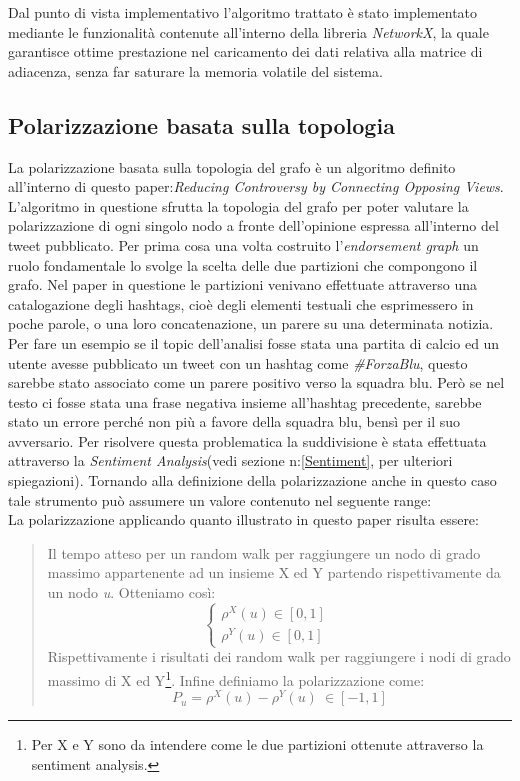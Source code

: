 Dal punto di vista implementativo l'algoritmo trattato è stato implementato mediante le funzionalità contenute all'interno della libreria \textit{NetworkX}, la quale garantisce ottime prestazione nel caricamento dei dati relativa alla matrice di adiacenza, senza far saturare la memoria volatile del sistema.
\newpage
\subsection{Polarizzazione basata sulla topologia}
La polarizzazione basata sulla topologia del grafo è un algoritmo definito all'interno di questo paper:\textit{Reducing Controversy by Connecting Opposing Views}.
L'algoritmo in questione sfrutta la topologia del grafo per poter valutare la polarizzazione di ogni singolo nodo a fronte dell'opinione espressa all'interno del tweet pubblicato.
Per prima cosa una volta costruito l'\textit{endorsement graph} un ruolo fondamentale lo svolge la scelta delle due partizioni che compongono il grafo.
Nel paper in questione le partizioni venivano effettuate attraverso una catalogazione degli hashtags, cioè degli elementi testuali che esprimessero in poche parole, o una loro concatenazione, un parere su una determinata notizia.
Per fare un esempio se il topic dell'analisi fosse stata una partita di calcio ed un utente avesse pubblicato un tweet con un hashtag come \textit{\#ForzaBlu}, questo sarebbe stato associato come un parere positivo verso la squadra blu. Però se nel testo ci fosse stata una frase negativa insieme all'hashtag precedente, sarebbe stato un errore perché non più a favore della squadra blu, bensì per il suo avversario. Per risolvere questa problematica la suddivisione è stata effettuata attraverso la \textit{Sentiment Analysis}(vedi sezione n:\ref{Sentiment}, per ulteriori spiegazioni). 
Tornando alla definizione della polarizzazione anche in questo caso tale strumento può assumere un valore contenuto nel seguente range:
\begin{equation}
[-1,1]
\end{equation}
La polarizzazione applicando quanto illustrato in questo paper risulta essere:
\begin{quote}
Il tempo atteso per un random walk per raggiungere un nodo di grado massimo appartenente ad un insieme X ed Y partendo rispettivamente da un nodo \textit{u}. Otteniamo così:
\[
\begin{cases}
    \rho^{X}(u) \in [0,1]       & \quad \\
     \rho^{Y}(u) \in [0,1]   & \quad 
  \end{cases}
\]
Rispettivamente i risultati dei random walk per raggiungere i nodi di grado massimo di X ed Y\footnote{Per X e Y sono da intendere come le due partizioni ottenute attraverso la sentiment analysis.}. 
Infine definiamo la polarizzazione come:
\begin{equation}\label{polar}
P_{u}= \rho^{X}(u)-\rho^{Y}(u) \ \in [-1,1] 
\end{equation}
\end{quote}
